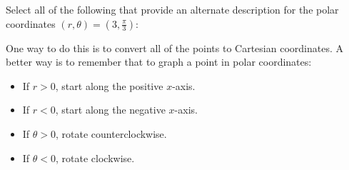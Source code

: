 \documentclass{ximera}
\author{Jim Talamo }
\begin{document}
\begin{exercise}

Select all of the following that provide an alternate description for the polar coordinates $(r, \theta) = \left(3,\frac{\pi}{3}\right)$:

\begin{selectAll}
\end{selectAll}

\begin{hint}
One way to do this is to convert all of the points to Cartesian coordinates.  A better way is to remember that to graph a point in polar coordinates:

\begin{itemize}
\item If $r>0$, start along the positive $x$-axis.
\item If $r<0$, start along the negative $x$-axis.
\item If $\theta>0$, rotate counterclockwise.
\item If $\theta<0$, rotate clockwise.
\end{itemize}
\end{hint}
\end{exercise}
\end{document}
